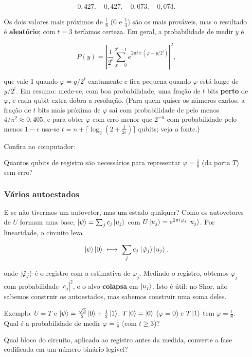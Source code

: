 \[
0{,}427,\quad 0{,}427,\quad 0{,}073,\quad 0{,}073 .
\]

Os dois valores mais próximos de \(\tfrac18\) (\(0\) e \(\tfrac14\)) são os mais prováveis, mas o resultado é \textbf{aleatório}; com \(t=3\) teríamos certeza. Em geral, a probabilidade de medir \(y\) é

\[
P(y)=\left|\frac{1}{2^t}\sum_{x=0}^{2^t-1}e^{2\pi i\,x\,(\varphi-y/2^t)}\right|^2 ,
\]

que vale 1 quando \(\varphi=y/2^t\) exatamente e fica pequena quando \(\varphi\) está longe de \(y/2^t\). Em resumo: mede-se, com boa probabilidade, uma fração de \(t\) bits \textbf{perto} de \(\varphi\), e cada qubit extra dobra a resolução. (Para quem quiser os números exatos: a fração de \(t\) bits mais próxima de \(\varphi\) sai com probabilidade de pelo menos \(4/\pi^2\approx0{,}405\), e para obter \(\varphi\) com erro menor que \(2^{-n}\) com probabilidade pelo menos \(1-\epsilon\) usa-se \(t=n+\lceil\log_2(2+\tfrac1{2\epsilon})\rceil\) qubits; veja a fonte.)

Confira no computador:

Quantos qubits de registro são necessários para representar \(\varphi=\tfrac18\) (da porta \(T\)) sem erro?

\subsubsection{Vários autoestados}\label{vuxe1rios-autoestados}

E se não tivermos um autovetor, mas um estado qualquer? Como os autovetores de \(U\) formam uma base, \(\left|{\psi}\right>=\sum_j c_j\left|{u_j}\right>\) com \(U\left|{u_j}\right>=e^{2\pi i\varphi_j}\left|{u_j}\right>\). Por linearidade, o circuito leva

\[
\left|{\psi}\right>\left|{0}\right>\ \longmapsto\ \sum_j c_j\,\left|{\tilde\varphi_j}\right>\left|{u_j}\right>,
\]

onde \(\left|{\tilde\varphi_j}\right>\) é o registro com a estimativa de \(\varphi_j\). Medindo o registro, obtemos \(\varphi_j\) com probabilidade \(|c_j|^2\), e o alvo \textbf{colapsa} em \(\left|{u_j}\right>\). Isto é útil: no Shor, não sabemos construir os autoestados, mas sabemos construir uma soma deles.

Exemplo: \(U=T\) e \(\left|{\psi}\right>=\tfrac{\sqrt3}{2}\left|{0}\right>+\tfrac12\left|{1}\right>\). \(T\left|{0}\right>=\left|{0}\right>\) (\(\varphi=0\)) e \(T\left|{1}\right>\) tem \(\varphi=\tfrac18\). Qual é a probabilidade de medir \(\varphi=\tfrac18\) (com \(t\ge3\))?

Qual bloco do circuito, aplicado ao registro antes da medida, converte a fase codificada em um número binário legível?

